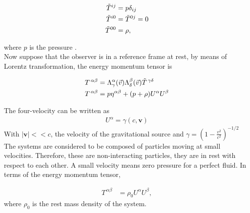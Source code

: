  \begin{align}
        \Tilde{T}^{ij}&=p\delta_{ij}\\
        \Tilde{T}^{i0}&=\Tilde{T}^{0j}=0\\
        \Tilde{T}^{00}&=\rho,
        \label{eq: Tperfectfluid}
    \end{align}
    
where $p$ is the pressure  \cite{Weinberg}.\\

Now suppose that the observer is in a reference frame at rest, by means of Lorentz transformation, the energy momentum tensor is \cite{Weinberg}

 \begin{align}
        T^{\,\alpha\beta}&= \Lambda^\alpha_\gamma(\vec{v}) \Lambda^\beta_\delta(\vec{v}) \Tilde{T}^{\,\gamma\delta} \\
        T^{\,\alpha\beta}&= p\eta^{\alpha\beta}+(p+\rho)U^{\alpha}U^{\beta}  
    \end{align}
    
The four-velocity can be written as 
 \begin{align}
        U^{\alpha} = \gamma(c, \textbf{v})
    \end{align}
 With $|\textbf{v}| << c$, the velocity of the gravitational source and $\gamma = \left(1-\frac{v^2}{c^2}\right)^{-1/2}$\\
    
The systems are considered to be composed of particles moving at small velocities. Therefore, these are non-interacting particles, they are in rest with respect to each other. A small velocity means zero pressure for a perfect fluid. In terms of the energy momentum tensor,

 \begin{align}
        T^{\,\alpha\beta}&= \rho_0U^{\alpha}U^{\beta},
        \label{eq:Tincoherentmatter}
    \end{align}
 where $\rho_0$ is the rest mass density of the system. 
 
